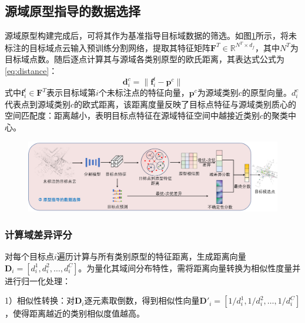 \subsection{源域原型指导的数据选择}
源域原型构建完成后，可将其作为基准指导目标域数据的筛选。如图\ref{fig:3-3}所示，将未标注的目标域点云输入预训练分割网络，提取其特征矩阵\( \mathbf{F}^T \in \mathbb{R}^{N^T \times d_f} \)，其中\(N^T\)为目标域点数。随后逐点计算其与源域各类别原型的欧氏距离，其表达式公式为\eqref{eq:distance}：
\begin{equation}
    \label{eq:distance}
    \mathbf{d}_i^c = \| \mathbf{f}_i^t - \mathbf{p}^c \|
\end{equation}
式中\( \mathbf{f}_i^t \in \mathbf{F}^T \)表示目标域第\( i \)个未标注点的特征向量，\(\mathbf{p}^c\)为源域类别\(c\)的原型向量。\( d_i^c \)代表点到源域类别\(c\)的欧式距离，该距离度量反映了目标点特征与源域类别质心的空间匹配度：距离越小，表明目标点特征在源域特征空间中越接近类别\( c \)的聚类中心。
\vspace{-0.1cm}
\begin{figure}[h]
    \centering
    \includegraphics[width = \textwidth]{ljx/figure/3-3.pdf}
    \label{fig:3-3}
\end{figure}
\vspace{-0.35cm}
\subsubsection{计算域差异评分}
对每个目标点\(i\)遍历计算与所有类别原型的特征距离，生成距离向量\( \mathbf{D}_i = [d_i^1, d_i^2, \dots, d_i^C] \)。为量化其域间分布特性，需将距离向量转换为相似性度量并进行归一化处理：

1）相似性转换：对\( \mathbf{D}_i\)逐元素取倒数，得到相似性向量\( \mathbf{D'}_i = [1/d_i^1, 1/d_i^2, \dots, 1/d_i^C] \)，使得距离越近的类别相似度值越高。

